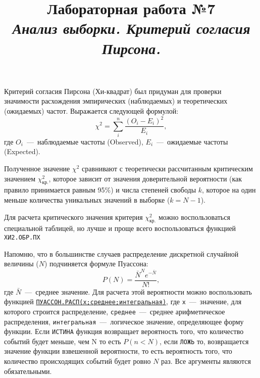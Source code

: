 \documentclass[14pt,a4paper]{article}
\title{Лабораторная работа №7 \\ \textit{Анализ выборки. Критерий согласия Пирсона.}}
\begin{document}
\maketitle
Критерий согласия Пирсона (Хи-квадрат) был придуман для проверки значимости расхождения эмпирических (наблюдаемых) и теоретических (ожидаемых) частот. Выражается следующей формулой:
\begin{equation} \label{PoissonDistrib}
    \chi^2 = \sum\limits_i^n \frac{(O_i - E_i)^2}{E_i},
\end{equation}
где $O_i$~---~наблюдаемые частоты (Observed), $E_i$~---~ожидаемые частоты (Expected). 

Полученное значение $\chi^2$ сравнивают с теоретически рассчитанным критическим значением $\chi^2_\text{кр.}$, которое зависит от значения доверительной вероятности (как правило принимается равным 95\%) и числа степеней свободы $k$, которое на один меньше количества уникальных значений в выборке ($k = N - 1$). 

Для расчета критического значения критерия $\chi^2_\text{кр.}$ можно воспользоваться специальной таблицей, но лучше и проще всего воспользоваться функцией \texttt{ХИ2.ОБР.ПХ}

Напомню, что в большинстве случаев распределение дискретной случайной величины ($N$) подчиняется формуле Пуассона:
\begin{equation}
	P(N) = \frac{\bar{N}^N e^{-\bar{N}}}{N!},
\end{equation}
где $\bar{N}$~---~среднее значение. Для расчета этой вероятности можно воспользовать функцией \href{https://support.microsoft.com/ru-ru/office/%D1%84%D1%83%D0%BD%D0%BA%D1%86%D0%B8%D1%8F-%D0%BF%D1%83%D0%B0%D1%81%D1%81%D0%BE%D0%BD-%D1%80%D0%B0%D1%81%D0%BF-8fe148ff-39a2-46cb-abf3-7772695d9636}{\texttt{ПУАССОН.РАСП(x;среднее;интегральная)}}, 
где 
\verb=x=~---~значение, для которого строится распределение,
\verb=среднее=~---~среднее арифметическое распределения,
\verb=интегральная=~---~логическое значение, определяющее форму функции. Если \texttt{ИСТИНА} функция возвращает вероятность того, что количество событий будет меньше, чем N то есть $P(n<N)$, если \texttt{ЛОЖЬ} то, возвращается значение функции взвешенной вероятности, то есть вероятность того, что количество происходящих событий будет ровно $N$ раз. Все аргументы являются обязательными.

\end{document}

